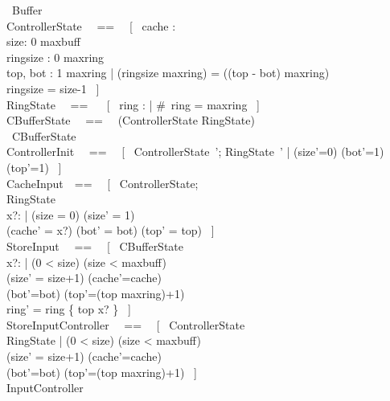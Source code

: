 \begin{circus}
    \circprocess\ Buffer \circdef \circbegin \\
    ControllerState ~~==~~ [~ cache : \nat
        \\%
        size: 0 \upto maxbuff
        \\%
        ringsize : 0 \upto maxring
        \\%
        top, bot : 1 \upto maxring
        |
        (ringsize \mod maxring) = ((top - bot) \mod maxring)
        \\%
        ringsize = size-1
        ~] \\
    RingState ~~== ~~ [~ ring : \seq \nat | \#~ring = maxring ~] \\
    CBufferState ~~==~~ (ControllerState \lor RingState) \\
    \circstate\  CBufferState \\
    ControllerInit ~~==~~ [~ ControllerState~'; RingState~' | (size'=0) \land (bot'=1) \land (top'=1) ~] \\
    CacheInput~~==~~ [~ \Delta ControllerState;
        \\%
        \Xi RingState
        \\%
        x?:\nat
        |
        (size = 0) \land (size' = 1)
        \\%
        (cache' = x?) \land (bot' = bot) \land (top' = top) ~]\\
    StoreInput ~~==~~ [~ \Delta CBufferState
        \\%
        x?: \nat
        |
        (0 < size) \land (size < maxbuff)
        \\%
        (size' = size+1) \land (cache'=cache)
        \\%
        (bot'=bot) \land (top'=(top \mod maxring)+1)
        \\%
        ring' = ring \oplus \{ top \mapsto x? \} ~] \\
    StoreInputController ~~==~~ [~ \Delta ControllerState
        \\%
        \Xi RingState
        |
        (0 < size) \land (size < maxbuff)
        \\%
        (size' = size+1) \land (cache'=cache)
        \\%
        (bot'=bot) \land (top'=(top \mod maxring)+1) ~] \\
    InputController ~~\circdef~~ \\


\end{circus}
